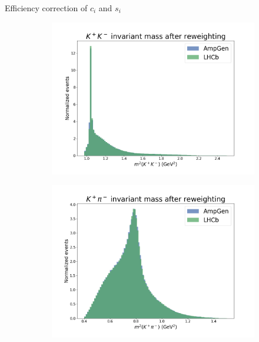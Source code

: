 \documentclass{beamer}
\begin{document}
\begin{frame}{Efficiency correction of $c_i$ and $s_i$}
  \begin{figure}
    \centering
    \begin{subfigure}{0.33\textwidth}
      \includegraphics[width = 1.0\textwidth]{Plots/s01_AfterReweighting.png}
    \end{subfigure}%
    \begin{subfigure}{0.33\textwidth}
      \includegraphics[width = 1.0\textwidth]{Plots/s03_AfterReweighting.png}
    \end{subfigure}%
    \begin{subfigure}{0.33\textwidth}

\end{subfigure}
\end{figure}
\end{frame}
\end{document}
